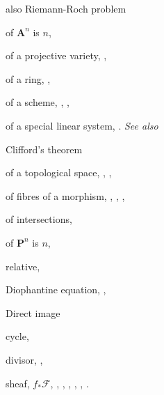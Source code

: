 {{\noindent\hspace*{15.0bp}also Riemann-Roch problem\par
\noindent\hspace*{7.5bp}of $\mathbf A^n$ is $n$, \par
\noindent\hspace*{7.5bp}of a projective variety, , \par
\noindent\hspace*{7.5bp}of a ring, , \par
\noindent\hspace*{7.5bp}of a scheme, , , \par
\noindent\hspace*{7.5bp}of a special linear system, . \emph{See also}\par
\noindent\hspace*{15.0bp}Clifford's theorem\par
\noindent\hspace*{7.5bp}of a topological space, , , \par
\noindent\hspace*{7.5bp}of fibres of a morphism, , , , \par
\noindent\hspace*{7.5bp}of intersections, \par
\noindent\hspace*{7.5bp}of $\mathbf P^n$ is $n$, \par
\noindent\hspace*{7.5bp}relative, \par
}\hfill%
\parbox[t]{162.5bp}{\fontsize{8.05}{8.49}\selectfont%
\raggedright\setlength{\parskip}{0pt}%
\noindent\hspace*{0.0bp}Diophantine equation, , \par
\noindent\hspace*{0.0bp}Direct image\par
\noindent\hspace*{7.5bp}cycle, \par
\noindent\hspace*{7.5bp}divisor, , \par
\noindent\hspace*{7.5bp}sheaf, $f_*\mathcal F$, , , , , , .\par
}}
